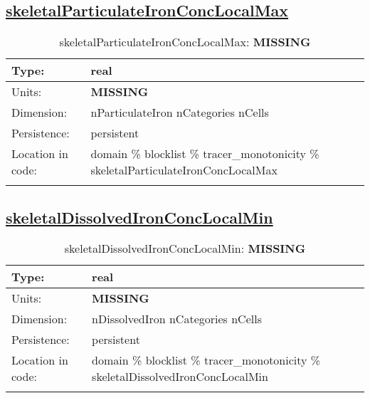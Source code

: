 \subsection[skeletalParticulateIronConcLocalMax]{\hyperref[sec:var_tab_tracer_monotonicity]{skeletalParticulateIronConcLocalMax}}
\label{subsec:var_sec_tracer_monotonicity_skeletalParticulateIronConcLocalMax}
\begin{center}
\begin{longtable}{| p{2.0in} | p{4.0in} |}
        \hline 
        Type: & real \\
        \hline 
        Units: & {\bf \color{red} MISSING} \\
        \hline 
        Dimension: & nParticulateIron nCategories nCells \\
        \hline 
        Persistence: & persistent \\
        \hline 
         Location in code: & domain \% blocklist \% tracer\_monotonicity \% skeletalParticulateIronConcLocalMax \\
         \hline 
    \caption{skeletalParticulateIronConcLocalMax: {\bf \color{red} MISSING}}
\end{longtable}
\end{center}
\subsection[skeletalDissolvedIronConcLocalMin]{\hyperref[sec:var_tab_tracer_monotonicity]{skeletalDissolvedIronConcLocalMin}}
\label{subsec:var_sec_tracer_monotonicity_skeletalDissolvedIronConcLocalMin}
\begin{center}
\begin{longtable}{| p{2.0in} | p{4.0in} |}
        \hline 
        Type: & real \\
        \hline 
        Units: & {\bf \color{red} MISSING} \\
        \hline 
        Dimension: & nDissolvedIron nCategories nCells \\
        \hline 
        Persistence: & persistent \\
        \hline 
         Location in code: & domain \% blocklist \% tracer\_monotonicity \% skeletalDissolvedIronConcLocalMin \\
         \hline 
    \caption{skeletalDissolvedIronConcLocalMin: {\bf \color{red} MISSING}}
\end{longtable}
\end{center}
